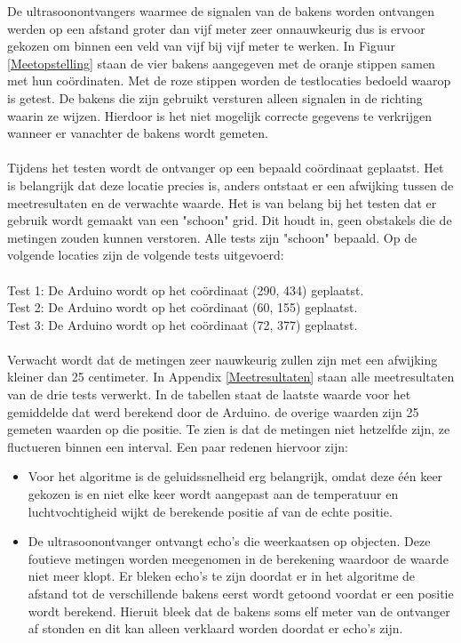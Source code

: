 \documentclass{article}
\begin{document}
De ultrasoonontvangers waarmee de signalen van de bakens worden ontvangen werden op een afstand groter dan vijf meter zeer onnauwkeurig dus is ervoor gekozen om binnen een veld van vijf bij vijf meter te werken. In Figuur \ref{Meetopstelling} staan de vier bakens aangegeven met de oranje stippen samen met hun co\"{o}rdinaten. Met de roze stippen worden de testlocaties bedoeld waarop is getest. De bakens die zijn gebruikt versturen alleen signalen in de richting waarin ze wijzen. Hierdoor is het niet mogelijk correcte gegevens te verkrijgen wanneer er vanachter de bakens wordt gemeten. \\
\\
Tijdens het testen wordt de ontvanger op een bepaald co\"{o}rdinaat geplaatst. Het is belangrijk dat deze locatie precies is, anders ontstaat er een afwijking tussen de meetresultaten en de verwachte waarde. 
Het is van belang bij het testen dat er gebruik wordt gemaakt van een "schoon" grid. Dit houdt in, geen obstakels die de metingen zouden kunnen verstoren. Alle tests zijn "schoon"  bepaald. 
Op de volgende locaties zijn de volgende tests uitgevoerd:\\
\\
\indent Test 1: De Arduino wordt op het co\"{o}rdinaat (290, 434) geplaatst. \\
\indent Test 2: De Arduino wordt op het co\"{o}rdinaat (60, 155) geplaatst. \\
\indent Test 3: De Arduino wordt op het co\"{o}rdinaat (72, 377) geplaatst. \\
\\
Verwacht wordt dat de metingen zeer nauwkeurig zullen zijn met een afwijking kleiner dan 25 centimeter. 
In Appendix \ref{Meetresultaten} staan alle meetresultaten van de drie tests verwerkt. In de tabellen staat de laatste waarde voor het gemiddelde dat werd berekend door de Arduino. de overige waarden zijn 25 gemeten waarden op die positie. Te zien is dat de metingen niet hetzelfde zijn, ze fluctueren binnen een interval. Een paar redenen hiervoor zijn: 
\begin{itemize}
	\item Voor het algoritme is de geluidssnelheid erg belangrijk, omdat deze \'{e}\'{e}n keer gekozen is en niet elke keer wordt aangepast aan de temperatuur en luchtvochtigheid wijkt de berekende positie af van de echte positie. 
	\item De ultrasoonontvanger ontvangt echo's die weerkaatsen op objecten. Deze foutieve metingen worden meegenomen in de berekening waardoor de waarde niet meer klopt. Er bleken echo's te zijn doordat er in het algoritme de afstand tot de verschillende bakens eerst wordt getoond voordat er een positie wordt berekend. Hieruit bleek dat de bakens soms elf meter van de ontvanger af stonden en dit kan alleen verklaard worden doordat er echo's zijn.  
\end{itemize}
\end{document}
